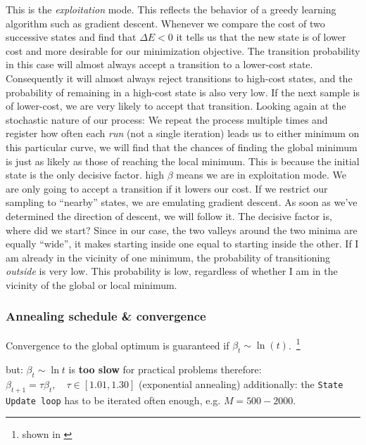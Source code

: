 {\begin{itemize}
This is the \emph{exploitation} mode. This reflects the behavior of a greedy learning algorithm such as gradient descent. Whenever we compare the cost of two successive states and find that $\Delta E < 0$ it tells us that the new state is of lower cost and more desirable for our minimization objective. The transition probability in this case will almost always accept a transition to a lower-cost state. Consequently it will almost always reject transitions to high-cost states, and the probability of remaining in a high-cost state is also very low. If the next sample is of lower-cost, we are very likely to accept that transition. Looking again at the stochastic nature of our process: We repeat the process multiple times and register how often each \emph{run} (not a single iteration) leads us to either minimum on this particular curve, we will find that the chances of finding the global minimum is just as likely as those of reaching the local minimum. This is because the initial state is the only decisive factor. high $\beta$ means we are in exploitation mode. We are only going to accept a transition if it lowers our cost. If we restrict our sampling to ``nearby'' states, we are emulating gradient descent. As soon as we've determined the direction of descent, we will follow it. The decisive factor is, where did we start? Since in our case, the two valleys around the two minima are equally ``wide'', it makes starting inside one equal to starting inside the other. If I am already in the vicinity of one minimum, the probability of transitioning \emph{outside} is very low. This probability is low, regardless of whether I am in the vicinity of the global or local minimum.
\end{itemize}
}

\begin{frame}\frametitle{Annealing schedule \& convergence}
Convergence to the global optimum is guaranteed if $\beta_t \sim \ln (t)$.~\footnote{shown in \citep{geman1984stochastic}}

\begin{itemize}
	\itR but: $\beta_t \sim \ln t$ is \textbf{too slow} for practical problems
	\itR therefore: $\beta_{t+1} = \tau \beta_t, \quad \tau \in [1.01,1.30]$
		(exponential annealing)
	\itR additionally: the \texttt{State Update loop} has to be iterated often enough, e.g. $M=500-2000$. 
\end{itemize}
\end{frame}

